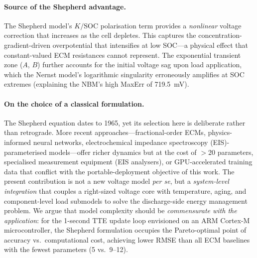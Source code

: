 \documentclass[5p,times,number]{elsarticle}
\begin{document}
\paragraph{Source of the Shepherd advantage.}
The Shepherd model's $K/\mathrm{SOC}$ polarisation term provides a \emph{nonlinear} voltage correction that increases as the cell depletes.
This captures the concentration-gradient-driven overpotential that intensifies at low SOC---a physical effect that constant-valued ECM resistances cannot represent.
The exponential transient zone ($A$, $B$) further accounts for the initial voltage sag upon load application, which the Nernst model's logarithmic singularity erroneously amplifies at SOC extremes (explaining the NBM's high MaxErr of \SI{719.5}{\milli\volt}).

\paragraph{On the choice of a classical formulation.}
The Shepherd equation dates to 1965, yet its selection here is deliberate rather than retrograde.
More recent approaches---fractional-order ECMs, physics-informed neural networks, electrochemical impedance spectroscopy (EIS)-parameterised models---offer richer dynamics but at the cost of $>$20 parameters, specialised measurement equipment (EIS analysers), or GPU-accelerated training data that conflict with the portable-deployment objective of this work.
The present contribution is not a new voltage model \emph{per se}, but a \emph{system-level integration} that couples a right-sized voltage core with temperature, aging, and component-level load submodels to solve the discharge-side energy management problem.
We argue that model complexity should be \emph{commensurate with the application}: for the 1-second TTE update loop envisioned on an ARM Cortex-M microcontroller, the Shepherd formulation occupies the Pareto-optimal point of accuracy vs.\ computational cost, achieving lower RMSE than all ECM baselines with the fewest parameters (5 vs.\ 9--12).
\end{document}
